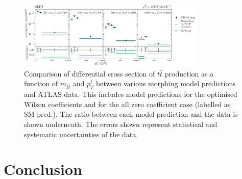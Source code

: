 \documentclass[a4paper,11pt]{article}
\begin{document}
\begin{figure}[htb]
    \centering
    \includegraphics[width=0.8\textwidth]{plots/ATLAS_model_result_2D_2OP.png}
    \caption{Comparison of differential cross section of $t\bar{t}$ production as a function of $m_{t\bar{t}}$ and $p_{T}^{t}$ between various morphing model predictions and ATLAS data. This includes model predictions for the optimised Wilson coefficients and for the all zero coefficient case (labelled as SM pred.). The ratio between each model prediction and the data is shown underneath. The errors shown represent statistical and systematic uncertainties of the data.}
    \label{fig:model_result_2D_2OP}
\end{figure}

\section{Conclusion}

\clearpage
\begingroup
\raggedright{}
\sloppy
\printbibliography{}
\endgroup
\end{document}
